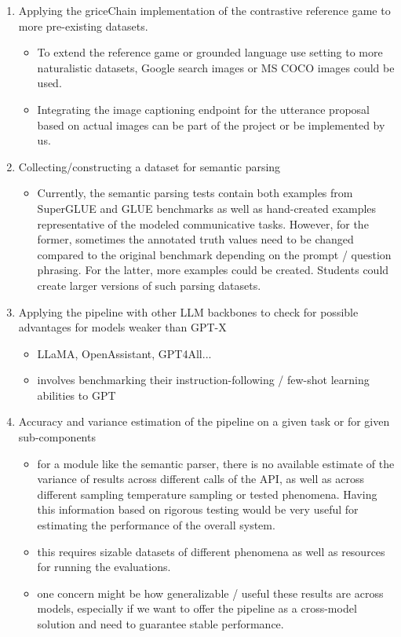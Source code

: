 \documentclass[fleqn,reqno,10pt]{article}
\begin{document}
\begin{enumerate}
    \item Applying the griceChain implementation of the contrastive reference game to more pre-existing datasets.
        \begin{itemize}
            \item To extend the reference game or grounded language use setting to more naturalistic datasets, Google search images or MS COCO images could be used.
            \item Integrating the image captioning endpoint for the utterance proposal based on actual images can be part of the project or be implemented by us.
        \end{itemize}
        \item Collecting/constructing a dataset for semantic parsing
        \begin{itemize}
            \item Currently, the semantic parsing tests contain both examples from SuperGLUE and GLUE benchmarks as well as hand-created examples representative of the modeled communicative tasks. However, for the former, sometimes the annotated truth values need to be changed compared to the original benchmark depending on the prompt / question phrasing. For the latter, more examples could be created. Students could create larger versions of such parsing datasets.
        \end{itemize}
            \item Applying the pipeline with other LLM backbones to check for possible advantages for models weaker than GPT-X
        \begin{itemize}
            \item LLaMA, OpenAssistant, GPT4All...
            \item involves benchmarking their instruction-following / few-shot learning abilities to GPT
        \end{itemize}
    \item Accuracy and variance estimation of the pipeline on a given task or for given sub-components
    \begin{itemize}
        \item for a module like the semantic parser, there is no available estimate of the variance of results across different calls of the API, as well as across different sampling temperature sampling or tested phenomena. Having this information based on rigorous testing would be very useful for estimating the performance of the overall system.
        \item this requires sizable datasets of different phenomena as well as resources for running the evaluations.
        \item one concern might be how generalizable / useful these results are across models, especially if we want to offer the pipeline as a cross-model solution and need to guarantee stable performance.
    \end{itemize}
\end{enumerate}
\end{document}
